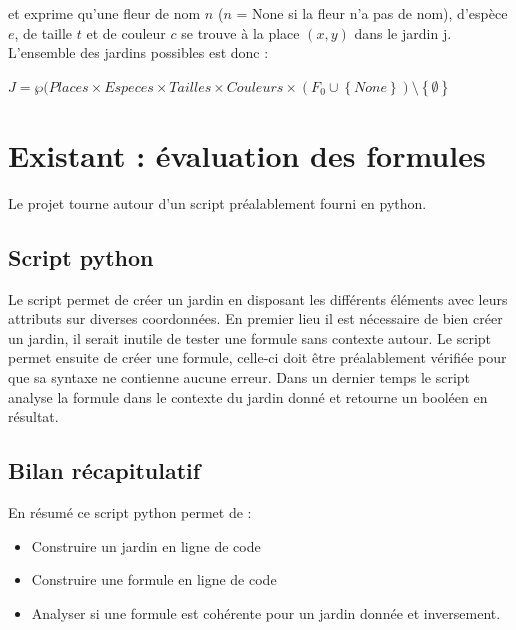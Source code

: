 \noindent
et exprime qu'une fleur de nom $n$ ($n$ = None si la fleur n'a pas de
nom), d'espèce $e$, de taille $t$ et de couleur $c$ se trouve à la
place $(x, y)$ dans le jardin j. L'ensemble des jardins possibles est
donc :
 
  \begin{center}
  $J = \wp(Places \times Especes \times Tailles \times Couleurs \times(F_0 \cup \left \{None\right \})\setminus\left \{\emptyset\right \}$ 
 \end{center}




\newpage

\section{Existant : évaluation des formules}

Le projet tourne autour d'un script préalablement fourni en python.

\subsection{Script python}

Le script permet de créer un jardin en disposant les différents éléments avec leurs attributs sur diverses coordonnées.
En premier lieu il est nécessaire de bien créer un jardin, il serait inutile de tester une formule sans contexte autour.
Le script permet ensuite de créer une formule, celle-ci doit être préalablement vérifiée pour que sa syntaxe ne contienne aucune erreur.
Dans un dernier temps le script analyse la formule dans le contexte du jardin donné et retourne un booléen en résultat.


\subsection{Bilan récapitulatif}

En résumé ce script python permet de :
\begin{itemize}
\item Construire un jardin en ligne de code
\item Construire une formule en ligne de code
\item Analyser si une formule est cohérente pour un jardin donnée et inversement.
\end{itemize}

